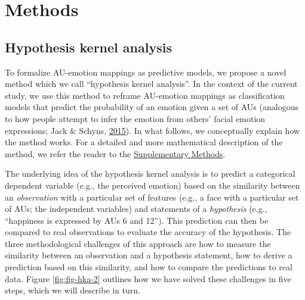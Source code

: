 \documentclass[11pt,american,a4paper,oneside,]{memoir} %
\begin{document}
\hypertarget{hka-methods}{%
\section{Methods}\label{hka-methods}}

\hypertarget{hypothesis-kernel-analysis-1}{%
\subsection{Hypothesis kernel analysis}\label{hypothesis-kernel-analysis-1}}

To formalize AU-emotion mappings as predictive models, we propose a novel method which we call ``hypothesis kernel analysis''. In the context of the current study, we use this method to reframe AU-emotion mappings as classification models that predict the probability of an emotion given a set of AUs (analogous to how people attempt to infer the emotion from others' facial emotion expressions; Jack \& Schyns, \protect\hyperlink{ref-Jack2015-sh}{2015}). In what follows, we conceptually explain how the method works. For a detailed and more mathematical description of the method, we refer the reader to the \protect\hyperlink{hypothesis-kernel-analysis-supplement}{Supplementary Methods}.

The underlying idea of the hypothesis kernel analysis is to predict a categorical dependent variable (e.g., the perceived emotion) based on the similarity between an \emph{observation} with a particular set of features (e.g., a face with a particular set of AUs; the independent variables) and statements of a \emph{hypothesis} (e.g., ``happiness is expressed by AUs 6 and 12''). This prediction can then be compared to real observations to evaluate the accuracy of the hypothesis. The three methodological challenges of this approach are how to measure the similarity between an observation and a hypothesis statement, how to derive a prediction based on this similarity, and how to compare the predictions to real data. Figure \ref{fig:fig-hka-2} outlines how we have solved these challenges in five steps, which we will describe in turn.
\end{document}
